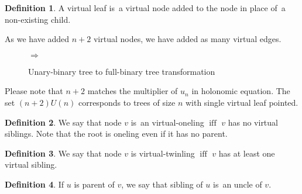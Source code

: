 \documentclass[final]{article}
\theoremstyle{definition}
\newtheorem{definition}{Definition}[subsection]
\theoremstyle{definition}
\theoremstyle{remark}
\DeclareMathOperator{\textiff}{\text{iff}}
\newcommand{\includeinlinesvg}[2]{\begin{minipage}{#1\textwidth}\end{minipage}}
\begin{document}
\begin{definition}
    A virtual leaf is~a virtual node added to the node in place of~a non-existing child.
\end{definition}

As we have added \(n + 2\) virtual nodes, we have added as many virtual edges.

\begin{figure}[H]
    \centering
    \includeinlinesvg{.2}{unary_binary__base}%
    \(\Rightarrow\)%
    \includeinlinesvg{.3}{unary_binary__full}
    \caption{Unary-binary tree to full-binary tree transformation}
    \label{fig:unary_binary_transformation}
\end{figure}

Please note that \(n + 2\) matches the multiplier of \(u_n\) in holonomic equation. The set \((n + 2) U(n)\) corresponds to trees of size \(n\) with single virtual leaf pointed.

\begin{definition}
    We say that node \(v\) is~an virtual-oneling \(\textiff\) \(v\) has no virtual siblings. Note that the root is oneling even if it has no parent.
\end{definition}

\begin{definition}
    We say that node \(v\) is virtual-twinling \(\textiff\) \(v\) has at least one virtual sibling.
\end{definition}

\begin{definition}
    If \(u\) is parent of \(v\), we say that sibling of \(u\) is~an uncle of \(v\).
\end{definition}
\end{document}
